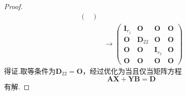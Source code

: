 {\begin{enumerate}[label=\arabic*）]
\begin{proof}
\begin{align*}
\begin{pmatrix}
                      \end{pmatrix}     \\
                       & \longrightarrow
                      \begin{pmatrix}
                          \bm{I}_{r_1} & \bm{O}      & \bm{O}       & \bm{O} \\
                          \bm{O}       & \bm{D}_{22} & \bm{O}       & \bm{O} \\
                          \bm{O}       & \bm{O}      & \bm{I}_{r_2} & \bm{O} \\
                          \bm{O}       & \bm{O}      & \bm{O}       & \bm{O}
                      \end{pmatrix}
                  \end{align*}
                  得证.取等条件为$\bm{D}_{22}=\bm{O}$，经过优化为当且仅当矩阵方程
                  \[
                      \bm{AX}+\bm{YB}=\bm{D}\]
                  有解.
              \end{proof}
    \end{enumerate}
}
